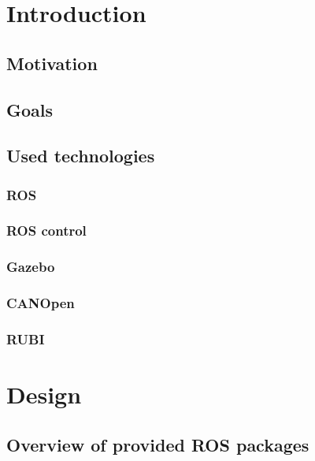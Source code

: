 \documentclass[english,inz,shortabstract]{iithesis}
\author         {Błażej Sowa}
\begin{document}
\chapter{Introduction}

\section{Motivation}

\section{Goals}

\section{Used technologies} %
\subsection{ROS}
\subsection{ROS control}
\subsection{Gazebo}
\subsection{CANOpen}
\subsection{RUBI}

\chapter{Design}
\section{Overview of provided ROS packages}




\end{document}
